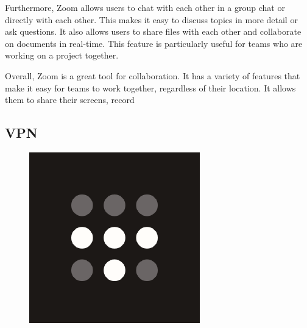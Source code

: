 \documentclass[12pt,a4paper]{report}
\begin{document}
Furthermore, Zoom allows users to chat with each other in a group chat or directly with each other. This makes it easy to discuss topics in more detail or ask questions. It also allows users to share files with each other and collaborate on documents in real-time. This feature is particularly useful for teams who are working on a project together.

Overall, Zoom is a great tool for collaboration. It has a variety of features that make it easy for teams to work together, regardless of their location. It allows them to share their screens, record

\subsection{\ac{VPN}}

\begin{figure}
\includegraphics[width=1\linewidth]{tailscale.png}
\end{figure}
\end{document}
